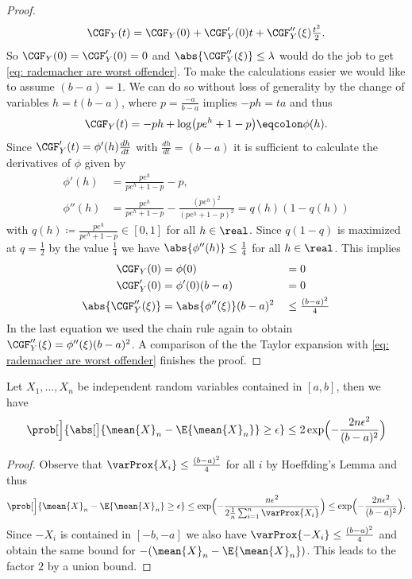 \begin{proof}
    \[
        \CGF_Y(t) = \CGF_Y(0) + \CGF_Y'(0)t + \CGF_Y''(\xi)\tfrac{t^2}{2}.
    \]
    So \(\CGF_Y(0) = \CGF_Y'(0)=0\) and \(\abs{\CGF_Y''(\xi)} \le \lambda\)
    would do the job to get \eqref{eq: rademacher are worst offender}. To
    make the calculations easier we would like to assume \((b-a)=1\).
    We can do so without loss of generality by the change of variables
    \(h=t(b-a)\), where \(p= \frac{-a}{b-a}\) implies \(-ph= ta\)
    and thus
    \[
        \CGF_Y(t)
        = -ph +  \log\bigl(p e^{h} + 1-p\bigr) \eqcolon \phi(h).
    \]
    Since \(\CGF_Y'(t) = \phi'(h) \frac{dh}{dt}\) with \(\frac{dh}{dt} =
    (b-a)\) it is sufficient to calculate the derivatives of \(\phi\) given by 
    \begin{align*}
        \phi'(h) &= \frac{pe^h}{pe^h +1-p} -p,
        \\
        \phi''(h) &= \frac{pe^h}{pe^h +1-p} - \frac{(pe^h)^2}{(pe^h +1-p)^2} = q(h)(1-q(h))
    \end{align*}
    with \(q(h) \coloneqq \frac{pe^h}{pe^h +1-p}\in [0,1]\) for all \(h\in \real\). Since \(q(1-q)\) is maximized at
    \(q=\frac12\) by the value \(\frac14\) we have \(\abs{\phi''(h)} \le \frac14\) for all \(h\in \real\).
    This implies
    \begin{alignat*}{2}
        \CGF_Y(0) &= \phi(0) &&= 0
        \\
        \CGF_Y'(0) &= \phi'(0)(b-a) &&= 0
        \\
        \abs{\CGF_Y''(\xi)} &= \abs{\phi''(\xi)}(b-a)^2 &&\le \tfrac{(b-a)^2}4
    \end{alignat*}
    In the last equation we used the chain rule again to obtain \(\CGF_Y''(\xi) = \phi''(\xi)(b-a)^2\). 
    A comparison of the the Taylor expansion with \eqref{eq: rademacher are worst
    offender} finishes the proof.
\end{proof}

\begin{mdframed}[innertopmargin=0pt]
\begin{corollary}
    \label{cor: hoeffding inequality for bounded random variables}
    Let \(X_1, \ldots, X_n\) be independent random variables contained in
    \([a,b]\), then we have
    \[
        \prob[\Big]{\abs[\big]{\mean{X}_n - \E{\mean{X}_n}} \ge \epsilon}
        \le 2 \exp\Bigl(-\frac{2n\epsilon^2}{(b-a)^2}\Bigr)
    \]
\end{corollary}
\end{mdframed}
\begin{proof}
    Observe that \(\varProx{X_i} \le \frac{(b-a)^2}4\) for all \(i\) by Hoeffding's Lemma and thus
    \[
        \prob[\Big]{\mean{X}_n - \E{\mean{X}_n} \ge \epsilon}
        \le \exp\Bigl(-\frac{n \epsilon^2}{2\frac1n\sum_{i=1}^n \varProx{X_i}}\Bigr)
        \le \exp\Bigl(-\frac{2n\epsilon^2}{(b-a)^2}\Bigr).
    \]
    Since \(-X_i\) is contained in \([-b, -a]\) we also have \(\varProx{-X_i} \le \frac{(b-a)^2}4\)
    and obtain the same bound for \(-(\mean{X}_n - \E{\mean{X}_n})\). This leads
    to the factor \(2\) by a union bound.
\end{proof}

